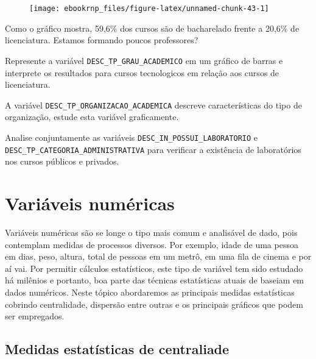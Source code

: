 \documentclass[11pt,]{style/krantz}
\theoremstyle{definition}
\theoremstyle{definition}
\theoremstyle{definition}
\theoremstyle{remark}
\let\BeginKnitrBlock\begin \let\EndKnitrBlock\end
\begin{document}
\begin{figure}[H]

{\centering \texttt{[image: ebookrnp\_files/figure-latex/unnamed-chunk-43-1]}

}

\end{figure}

Como o gráfico mostra, 59,6\% dos cursos são de bacharelado frente a 20,6\% de licenciatura. Estamos formando poucos professores?

\BeginKnitrBlock{exercise}
\protect\hypertarget{exr:unnamed-chunk-44}{}{\label{exr:unnamed-chunk-44} }Represente a variável \texttt{DESC\_TP\_GRAU\_ACADEMICO} em um gráfico de barras e interprete os resultados para cursos tecnologicos em relação aos cursos de licenciatura.
\EndKnitrBlock{exercise}

\BeginKnitrBlock{exercise}
\protect\hypertarget{exr:unnamed-chunk-45}{}{\label{exr:unnamed-chunk-45} }A variável \texttt{DESC\_TP\_ORGANIZACAO\_ACADEMICA} descreve características do tipo de organização, estude esta variável graficamente.
\EndKnitrBlock{exercise}

\BeginKnitrBlock{exercise}
\protect\hypertarget{exr:unnamed-chunk-46}{}{\label{exr:unnamed-chunk-46} }Analise conjuntamente as variáveis \texttt{DESC\_IN\_POSSUI\_LABORATORIO} e \texttt{DESC\_TP\_CATEGORIA\_ADMINISTRATIVA} para verificar a existência de laboratórios nos cursos públicos e privados.
\EndKnitrBlock{exercise}

\hypertarget{variaveis-numericas}{%
\section{Variáveis numéricas}\label{variaveis-numericas}}

Variáveis numéricas são se longe o tipo mais comum e analisável de dado, pois contemplam medidas de processos diversos. Por exemplo, idade de uma pessoa em dias, peso, altura, total de pessoas em um metrô, em uma fila de cinema e por aí vai. Por permitir cálculos estatísticos, este tipo de variável tem sido estudado há milênios e portanto, boa parte das técnicas estatísticas atuais de baseiam em dados numéricos. Neste tópico abordaremos as principais medidas estatísticas cobrindo centralidade, dispersão entre outras e os principais gráficos que podem ser empregados.

\hypertarget{medidas-estatisticas-de-centraliade}{%
\subsection{Medidas estatísticas de centraliade}\label{medidas-estatisticas-de-centraliade}}
\end{document}
